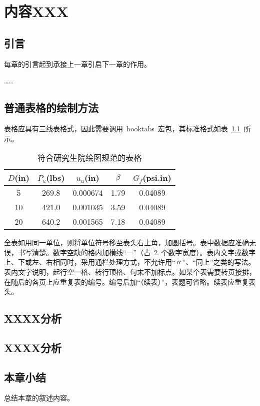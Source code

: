 
\chapter{内容XXX}

\section{引言}

每章的引言起到承接上一章引启下一章的作用。

\ldots\ldots

\section{普通表格的绘制方法}

表格应具有三线表格式，因此需要调用~booktabs~宏包，其标准格式如表~\ref{table1}~所示。
\begin{table}[htbp]
\caption{符合研究生院绘图规范的表格}
\label{table1}
\vspace{0.5em}\centering\wuhao
\begin{tabular}{ccccc}
\toprule[1.5pt]
$D$(in) & $P_u$(lbs) & $u_u$(in) & $\beta$ & $G_f$(psi.in)\\
\midrule[1pt]
 5 & 269.8 & 0.000674 & 1.79 & 0.04089\\
10 & 421.0 & 0.001035 & 3.59 & 0.04089\\
20 & 640.2 & 0.001565 & 7.18 & 0.04089\\
\bottomrule[1.5pt]
\end{tabular}
\end{table}
全表如用同一单位，则将单位符号移至表头右上角，加圆括号。表中数据应准确无误，书写清楚。数字空缺的格内加横线“－”（占~2~个数字宽度）。表内文字或数字上、下或左、右相同时，采用通栏处理方式，不允许用“〃”、“同上”之类的写法。表内文字说明，起行空一格、转行顶格、句末不加标点。如某个表需要转页接排，在随后的各页上应重复表的编号。编号后加“（续表）”，表题可省略。续表应重复表头。

\section{XXXX分析}

\lipsum[1]

\section{XXXX分析}

\lipsum[2]

\section{本章小结}

总结本章的叙述内容。

\lipsum[3]
